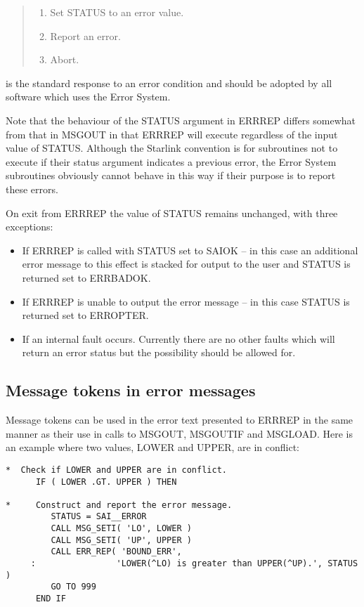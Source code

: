 \documentclass[twoside,11pt]{article}
\newcommand{\xlabel}[1]{}
\renewcommand{\_}{\texttt{\symbol{95}}}
\begin{document}
\begin {quote}
\begin {enumerate}
\item Set STATUS to an error value.
\item Report an error.
\item Abort.
\end {enumerate}
\end {quote}

is the standard response to an error condition and should be adopted by all
software which uses the Error System. 

Note that the behaviour of the STATUS argument in ERR\_REP differs somewhat 
from that in MSG\_OUT in that ERR\_REP will execute regardless of the input 
value of STATUS.
Although the Starlink convention is for subroutines not to execute if their
status argument indicates a previous error, the Error System subroutines
obviously cannot behave in this way if their purpose is to report these 
errors.

On exit from ERR\_REP the value of STATUS remains unchanged, with three
exceptions:

\begin{itemize}
\item If ERR\_REP is called with STATUS set to SAI\_\_OK -- in this case an
additional error message 
to this effect is stacked for output to the user and STATUS is returned set
to ERR\_\_BADOK.
\item If ERR\_REP is unable to output the error message -- in this case
STATUS is returned set to ERR\_\_OPTER.
\item If an internal fault occurs. Currently there are no other faults
which will return an error status but the possibility should be allowed for.
\end{itemize}


\subsection{\xlabel{message_tokens_in_error_messages}Message tokens in error messages \label{etok_sect}}

Message tokens can be used in the error text presented to ERR\_REP
in the same manner as their use in calls to MSG\_OUT, MSG\_OUTIF and 
MSG\_LOAD.
Here is an example where two values, LOWER and UPPER, are in conflict: 

\begin {small}
\begin{verbatim}
*  Check if LOWER and UPPER are in conflict.
      IF ( LOWER .GT. UPPER ) THEN

*     Construct and report the error message.
         STATUS = SAI__ERROR
         CALL MSG_SETI( 'LO', LOWER )
         CALL MSG_SETI( 'UP', UPPER )
         CALL ERR_REP( 'BOUND_ERR', 
     :                'LOWER(^LO) is greater than UPPER(^UP).', STATUS )
         GO TO 999
      END IF
\end{verbatim}
\end {small}
\end{document}
